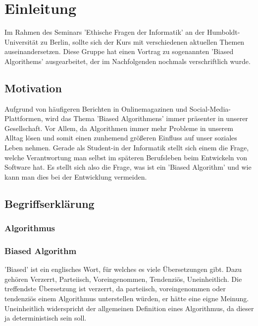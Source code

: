 \chapter{Einleitung}

Im Rahmen des Seminars 'Ethische Fragen der Informatik' an der Humboldt-Universität zu Berlin, sollte sich der Kurs mit verschiedenen aktuellen Themen auseinandersetzen. Diese Gruppe hat einen Vortrag zu sogenannten 'Biased Algorithems' ausgearbeitet, der im Nachfolgenden nochmals verschriftlich wurde.

\section{Motivation}

Aufgrund von häufigeren Berichten in Onlinemagazinen und Social-Media-Plattformen, wird das Thema 'Biased Algorithmens' immer präsenter in unserer Gesellschaft. Vor Allem, da Algorithmen immer mehr Probleme in unserem Alltag lösen und somit einen zunhemend größeren Einfluss auf unser soziales Leben nehmen.
Gerade als Student-in der Informatik stellt sich einem die Frage, welche Verantwortung man selbst im späteren Berufsleben beim Entwickeln von Software hat. Es stellt sich also die Frage, was ist ein 'Biased Algorithm' und wie kann man dies bei der Entwicklung vermeiden.



\section{Begriffserklärung}


\subsection{Algorithmus}


\subsection[biased]{Biased Algorithm}
'Biased' ist ein englisches Wort, für welches es viele Übersetzungen gibt. Dazu gehören Verzerrt, Parteiisch, Voreingenommen, Tendenziös, Uneinheitlich. Die treffendste Übersetzung ist verzerrt, da parteiisch, voreingenommen oder tendenziös einem Algorithmus unterstellen würden, er hätte eine eigne Meinung. Uneinheitlich widerspricht der allgemeinen Definition eines Algorithmus, da dieser ja deterministisch sein soll.  
